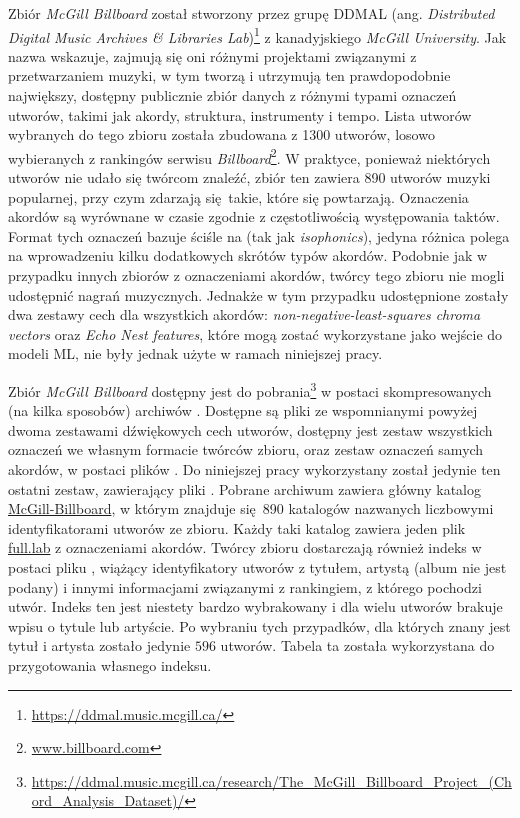 Zbiór \emph{McGill Billboard} \cite{burgoyne_expert_2011} został stworzony przez grupę DDMAL (ang. \emph{Distributed Digital Music Archives \& Libraries Lab})\footnote{\url{https://ddmal.music.mcgill.ca/}} z kanadyjskiego \emph{McGill University}. Jak nazwa wskazuje, zajmują się oni różnymi projektami związanymi z przetwarzaniem muzyki, w tym tworzą i utrzymują ten prawdopodobnie największy, dostępny publicznie zbiór danych z różnymi typami oznaczeń utworów, takimi jak akordy, struktura, instrumenty i tempo. Lista utworów wybranych do tego zbioru została zbudowana z 1300 utworów, losowo wybieranych z rankingów serwisu \emph{Billboard}\footnote{\url{www.billboard.com}}. W praktyce, ponieważ niektórych utworów nie udało się twórcom znaleźć, zbiór ten zawiera 890 utworów muzyki popularnej, przy czym zdarzają się takie, które się powtarzają. Oznaczenia akordów są wyrównane w czasie zgodnie z częstotliwością występowania taktów. Format tych oznaczeń bazuje ściśle na \cite{harte_towards_nodate} (tak jak \emph{isophonics}), jedyna różnica polega na wprowadzeniu kilku dodatkowych skrótów typów akordów.  Podobnie jak w przypadku innych zbiorów z oznaczeniami akordów, twórcy tego zbioru nie mogli udostępnić nagrań muzycznych. Jednakże w tym przypadku udostępnione zostały dwa zestawy cech dla wszystkich akordów: \emph{non-negative-least-squares chroma vectors} oraz \emph{Echo Nest features}, które mogą zostać wykorzystane jako wejście do modeli ML, nie były jednak użyte w ramach niniejszej pracy.

Zbiór \emph{McGill Billboard} dostępny jest do pobrania\footnote{\url{https://ddmal.music.mcgill.ca/research/The_McGill_Billboard_Project_(Chord_Analysis_Dataset)/}} w postaci skompresowanych (na kilka sposobów) archiwów . Dostępne są pliki ze wspomnianymi powyżej dwoma zestawami dźwiękowych cech utworów, dostępny jest zestaw wszystkich oznaczeń we własnym formacie twórców zbioru, oraz zestaw oznaczeń samych akordów, w postaci plików .  Do niniejszej pracy wykorzystany został jedynie ten ostatni zestaw, zawierający pliki . Pobrane archiwum zawiera główny katalog \url{McGill-Billboard}, w którym znajduje się 890 katalogów nazwanych liczbowymi identyfikatorami utworów ze zbioru. Każdy taki katalog zawiera jeden plik \url{full.lab} z oznaczeniami akordów. Twórcy zbioru dostarczają również indeks w postaci pliku , wiążący identyfikatory utworów z tytułem, artystą (album nie jest podany) i innymi informacjami związanymi z rankingiem, z którego pochodzi utwór. Indeks ten jest niestety bardzo wybrakowany i dla wielu utworów brakuje wpisu o tytule lub artyście. Po wybraniu tych przypadków, dla których znany jest tytuł i artysta zostało jedynie $596$ utworów. Tabela ta została wykorzystana do przygotowania własnego indeksu.

